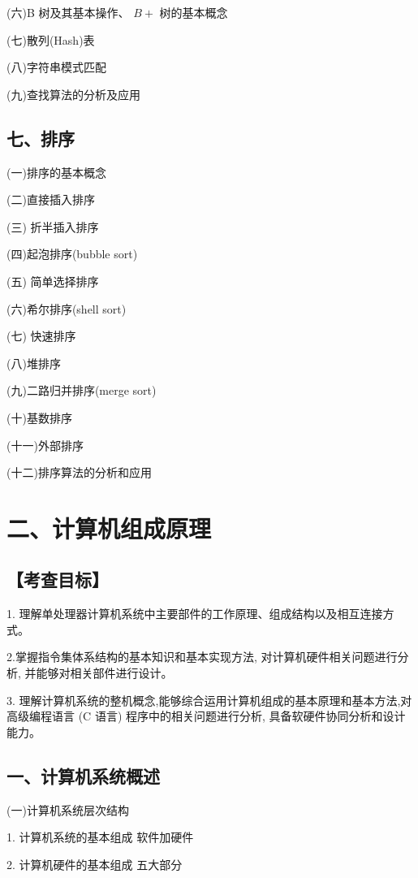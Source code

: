 \documentclass[10pt]{article}
\begin{document}
(六)B 树及其基本操作、 \(B +\) 树的基本概念

(七)散列(Hash)表

{\color{red}(八)字符串模式匹配}

(九)查找算法的分析及应用

\subsection*{七、排序}

(一)排序的基本概念

(二)直接插入排序

(三) 折半插入排序

(四)起泡排序(bubble sort)

(五) 简单选择排序

{\color{red}(六)希尔排序(shell sort)}

(七) 快速排序

(八)堆排序

(九)二路归并排序(merge sort)

{\color{red}(十)基数排序}

(十一)外部排序

(十二)排序算法的分析和应用

\section*{二、计算机组成原理}

\subsection*{【考查目标】}

1. 理解单处理器计算机系统中主要部件的工作原理、组成结构以及相互连接方式。

2.掌握指令集体系结构的基本知识和基本实现方法, 对计算机硬件相关问题进行分析, 并能够对相关部件进行设计。

3. 理解计算机系统的整机概念,能够综合运用计算机组成的基本原理和基本方法,对高级编程语言 (C 语言) 程序中的相关问题进行分析, 具备软硬件协同分析和设计能力。

\subsection*{一、计算机系统概述}

(一)计算机系统层次结构

1. 计算机系统的基本组成 软件加硬件

2. 计算机硬件的基本组成 五大部分
\end{document}
